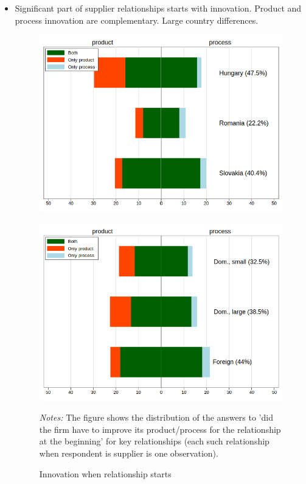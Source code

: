 \documentclass[final, dvipsnames, authoryear,12pt]{elsarticle}
\begin{document}

\begin{itemize}
    \item Significant part of supplier relationships starts with innovation. Product and process innovation are complementary. Large country differences.
  

    
 \begin{figure}[h]    
    \begin{center}
    \label{fig:inn}    
    \caption{Innovation when relationship starts}  
     \label{fig:innov}
    \begin{subfloat}[By country]
    {\includegraphics[scale=0.5]{graphs/Fig7a.png}}
    \end{subfloat}
    \begin{subfloat}
    {\includegraphics[scale=0.5]{graphs/Fig7b.png}}
    \end{subfloat}
    \end{center}
    {\footnotesize \textit{Notes:} The figure shows the distribution of the answers to ’did the firm have to improve its product/process for the relationship at the beginning’ for key relationships (each such relationship when respondent is supplier is one observation).}     
\end{figure}   
    


\end{itemize}
\end{document}
